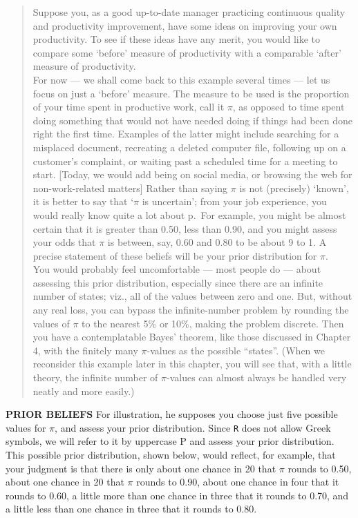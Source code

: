 \documentclass[]{book}
\begin{document}
\begin{quote}
Suppose you, as a good up-to-date manager practicing continuous quality and productivity improvement, have some ideas on improving your own productivity. To see if these ideas have any merit, you would like to compare some `before' measure of productivity with a comparable `after' measure of productivity.\\
For now --- we shall come back to this example several times --- let us focus on just a `before' measure.
The measure to be used is the proportion of your time spent in productive work, call it \(\pi\), as opposed to time spent doing something that would not have needed doing if things had been done right the first time. Examples of the latter might include searching for a misplaced document, recreating a deleted computer file, following up on a customer's complaint, or waiting past a scheduled time for a meeting to start. {[}Today, we would add being on social media, or browsing the web for non-work-related matters{]}
Rather than saying \(\pi\) is not (precisely) `known', it is better to say that `\(\pi\) is uncertain'; from your job experience, you would really know quite a lot about p.~For example, you might be almost certain that it is greater than 0.50, less than 0.90, and you might assess
your odds that \(\pi\) is between, say, 0.60 and 0.80 to be about 9 to 1. A precise statement of these beliefs will be your prior distribution for \(\pi\).\\
You would probably feel uncomfortable --- most people do --- about assessing this prior distribution, especially since there are an infinite number of states; viz., all of the values between zero and one. But, without any real loss, you can bypass the infinite-number problem by rounding the values of \(\pi\) to the nearest 5\% or 10\%, making the problem discrete. Then you have a contemplatable Bayes' theorem, like those discussed in Chapter 4, with the finitely many \(\pi\)-values as the possible ``states''. (When we reconsider this example later in this chapter, you will see that, with a little theory, the infinite number of \(\pi\)-values can almost always be handled very neatly and more easily.)
\end{quote}

\textbf{PRIOR BELIEFS} For illustration, he supposes you choose just five possible values for \(\pi\), and assess your prior distribution.
Since \texttt{R} does not allow Greek symbols, we will refer to it by uppercase P and assess your prior distribution. This possible prior distribution, shown below, would reflect, for example, that your judgment is that there is only about one chance in 20 that \(\pi\) rounds to 0.50, about one chance in 20 that \(\pi\) rounds to 0.90, about one chance in four that it rounds to 0.60, a little more than one chance in three that it rounds to 0.70, and a little less than one chance in three that it rounds to 0.80.
\end{document}
